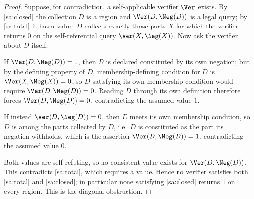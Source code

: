 \begin{proof}
Suppose, for contradiction, a self-applicable verifier $\Ver$ exists. By
\ref{sa:closed} the collection $D$ is a region and $\Ver(D,\Neg(D))$ is a legal
query; by \ref{sa:total} it has a value. $D$ collects exactly those parts $X$ for
which the verifier returns $0$ on the self-referential query $\Ver(X,\Neg(X))$.
Now ask the verifier about $D$ itself.

If $\Ver(D,\Neg(D))=1$, then $D$ is declared constituted by its own negation;
but by the defining property of $D$, membership-defining condition for $D$ is
$\Ver(X,\Neg(X))=0$, so $D$ satisfying its own membership condition would require
$\Ver(D,\Neg(D))=0$. Reading $D$ through its own definition therefore forces
$\Ver(D,\Neg(D))=0$, contradicting the assumed value $1$.

If instead $\Ver(D,\Neg(D))=0$, then $D$ meets its own membership condition, so
$D$ is among the parts collected by $D$, i.e.\ $D$ is constituted as the part its
negation withholds, which is the assertion $\Ver(D,\Neg(D))=1$, contradicting the
assumed value $0$.

Both values are self-refuting, so no consistent value exists for
$\Ver(D,\Neg(D))$. This contradicts \ref{sa:total}, which requires a value. Hence
no verifier satisfies both \ref{sa:total} and \ref{sa:closed}; in particular none
satisfying \ref{sa:closed} returns $1$ on every region. This is the diagonal
obstruction.
\end{proof}

